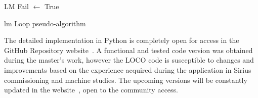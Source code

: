 \begin{algorithm}[h!]
\scriptsize
\SetAlgoLined
{}
LM Fail $\leftarrow$ True\\
 \caption{\gls{lm} Loop pseudo-algorithm}
 \label{algo:lm_loop}
\end{algorithm}

The detailed implementation in Python is completely open for access in the GitHub Repository website~\cite{locosirius}. A functional and tested code version was obtained during the master's work, however the LOCO code is susceptible to changes and improvements based on the experience acquired during the application in Sirius commissioning and machine studies. The upcoming versions will be constantly updated in the website~\cite{locosirius}, open to the community access.

